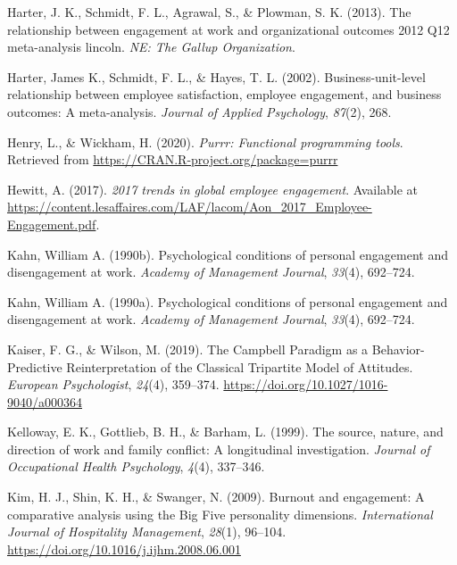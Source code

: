 \documentclass[
  man]{apa7}
\newlength{\cslhangindent}
\newlength{\cslentryspacingunit} %
\newenvironment{CSLReferences}[2] %
 {%
  \setlength{\parindent}{0pt}
  \ifodd #1
  \let\oldpar\par
  \def\par{\hangindent=\cslhangindent\oldpar}
  \fi
  \setlength{\parskip}{#2\cslentryspacingunit}
 }%
 {}
\begin{document}
\begin{CSLReferences}{1}{0}
\leavevmode{}%
Harter, J. K., Schmidt, F. L., Agrawal, S., \& Plowman, S. K. (2013). The relationship between engagement at work and organizational outcomes 2012 Q12 meta-analysis lincoln. \emph{{NE}: The Gallup Organization}.

\leavevmode{}%
Harter, James K., Schmidt, F. L., \& Hayes, T. L. (2002). Business-unit-level relationship between employee satisfaction, employee engagement, and business outcomes: A meta-analysis. \emph{Journal of Applied Psychology}, \emph{87}(2), 268.

\leavevmode{}%
Henry, L., \& Wickham, H. (2020). \emph{Purrr: Functional programming tools}. Retrieved from \url{https://CRAN.R-project.org/package=purrr}

\leavevmode{}%
Hewitt, A. (2017). \emph{2017 trends in global employee engagement}. Available at \url{https://content.lesaffaires.com/LAF/lacom/Aon_2017_Employee-Engagement.pdf}.

\leavevmode{}%
Kahn, William A. (1990b). Psychological conditions of personal engagement and disengagement at work. \emph{Academy of Management Journal}, \emph{33}(4), 692--724.

\leavevmode{}%
Kahn, William A. (1990a). Psychological conditions of personal engagement and disengagement at work. \emph{Academy of Management Journal}, \emph{33}(4), 692--724.

\leavevmode{}%
Kaiser, F. G., \& Wilson, M. (2019). The {Campbell} {Paradigm} as a {Behavior}-{Predictive} {Reinterpretation} of the {Classical} {Tripartite} {Model} of {Attitudes}. \emph{European Psychologist}, \emph{24}(4), 359--374. \url{https://doi.org/10.1027/1016-9040/a000364}

\leavevmode{}%
Kelloway, E. K., Gottlieb, B. H., \& Barham, L. (1999). The source, nature, and direction of work and family conflict: A longitudinal investigation. \emph{Journal of Occupational Health Psychology}, \emph{4}(4), 337--346.

\leavevmode{}%
Kim, H. J., Shin, K. H., \& Swanger, N. (2009). Burnout and engagement: {A} comparative analysis using the {Big} {Five} personality dimensions. \emph{International Journal of Hospitality Management}, \emph{28}(1), 96--104. \url{https://doi.org/10.1016/j.ijhm.2008.06.001}


\end{CSLReferences}
\end{document}
